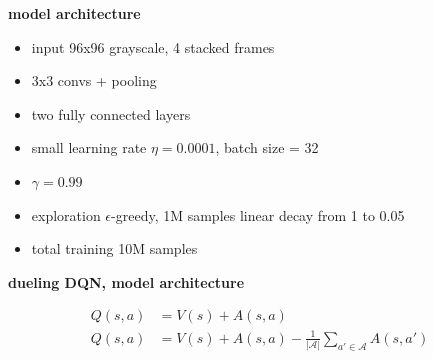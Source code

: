\documentclass[xcolor=dvipsnames]{beamer}
\begin{document}
\begin{frame}{\bf model architecture}


  \begin{itemize}
    \item input 96x96 grayscale, 4 stacked frames
    \item 3x3 convs + pooling
    \item two fully connected layers
    \item small learning rate $\eta = 0.0001$, batch size = 32
    \item $\gamma = 0.99$
    \item exploration $\epsilon$-greedy, 1M samples linear decay from 1 to 0.05
    \item total training 10M samples
  \end{itemize}
 
\end{frame}


\begin{frame}{\bf dueling DQN, model architecture}


  \begin{align*}
    Q(s, a) &= V(s) + A(s, a) \\
    Q(s, a) &= V(s) + A(s, a) - \frac{1}{|\mathcal{A}|}\sum_{a' \in \mathcal{A}}A(s, a')
  \end{align*}


\end{frame}
\end{document}
